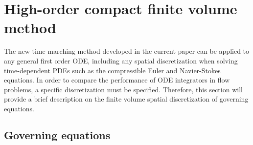 \section{High-order compact finite volume method}
\label{sec:CFV}

The new time-marching method developed in
the current paper can be applied to any general first order
ODE, including any spatial discretization when solving
time-dependent PDEs such as the compressible Euler and Navier-Stokes
equations.
In order to compare the performance of ODE integrators in flow problems,
a specific discretization must be specified.
Therefore,
this section will provide a brief description on the
finite volume spatial discretization of governing equations.

\subsection{Governing equations}
\label{ssec:GovEq}


